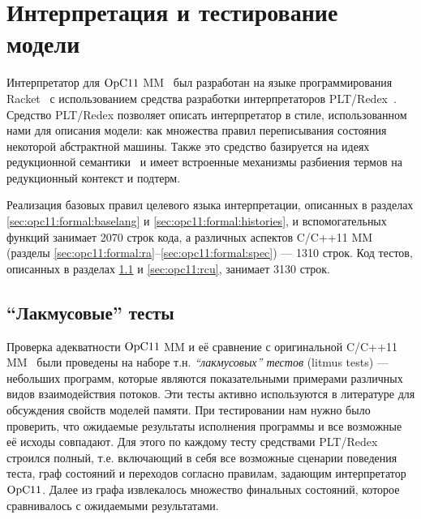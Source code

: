  
\section{Интерпретация и тестирование модели}
\label{sec:opc11:interpreter}

Интерпретатор для $\mathrm{OpC11}$ MM~\cite{opCppCode} был разработан на языке программирования Racket~\cite{Flatt-PLT:TR10,RacketLang}%
с использованием средства разработки интерпретаторов PLT/Redex~\cite{Klein-al:POPL12,Felleisen-al:BOOK09}.
Средство PLT/Redex позволяет описать интерпретатор в стиле, использованном нами для описания модели:
как множества правил переписывания состояния некоторой абстрактной машины.
Также это средство базируется на идеях редукционной семантики~\cite{Klein-al:POPL12,Felleisen-al:BOOK09,Felleisen-Hieb:TCS92}
и имеет встроенные механизмы разбиения термов на редукционный контекст и подтерм.

Реализация базовых правил целевого языка интерпретации, описанных в разделах
\ref{sec:opc11:formal:baselang} и \ref{sec:opc11:formal:histories}, и вспомогательных функций занимает
2070 строк кода, а различных аспектов C/C++11 MM
(разделы \ref{sec:opc11:formal:ra}--\ref{sec:opc11:formal:spec})
--- 1310 строк.
Код тестов, описанных в разделах \ref{sec:opc11:litmus} и \ref{sec:opc11:rcu}, занимает 3130 строк.

\subsection{``Лакмусовые'' тесты}
\label{sec:opc11:litmus}
Проверка адекватности $\mathrm{OpC11}$ MM и её сравнение с оригинальной C/C++11 MM~\cite{Batty-al:POPL11}
были проведены на наборе т.н. \emph{``лакмусовых'' тестов} (litmus tests) --- небольших программ, которые
являются показательными примерами различных видов взаимодействия потоков. Эти тесты активно используются в литературе
\cite{Bornat-al:LACE,Batty-al:POPL11,Lahav-al:POPL16,Maranget-al:tutorial,Turon-al:OOPSLA14}
для обсуждения свойств моделей памяти.
При тестировании нам нужно было проверить, что ожидаемые результаты
исполнения программы и все возможные её исходы совпадают.
Для этого по каждому тесту средствами PLT/Redex строился полный, т.е. включающий в себя все возможные сценарии
поведения теста, граф состояний и переходов согласно правилам, задающим интерпретатор $\mathrm{OpC11}$.
Далее из графа извлекалось множество финальных состояний, которое сравнивалось с ожидаемыми результатами.

